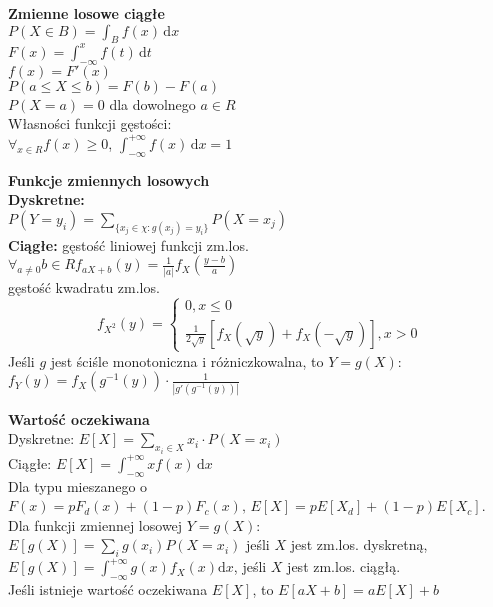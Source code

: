 \documentclass[10pt,landscape,a4paper,notitlepage]{article}
\begin{document}
\begin{multicols*}{4}
        \noindent \textbf{\large Zmienne losowe ciągłe}\\
        $P(X\in B)=\int_{B} f(x)\,\mathrm{d}x$\\
        $F(x)=\int_{-\infty}^xf(t)\,\mathrm{d}t$\\
        $f(x)=F'(x)$\\
        $P(a\leq X\leq b)=F(b)-F(a)$\\
        $P(X = a)=0$ dla dowolnego $a\in R$\\
        Własności funkcji gęstości:\\
        $\forall_{x\in R}f(x)\geq 0$, $\int_{-\infty}^{+\infty}f(x)\,\mathrm{d}x=1$
        

        \noindent\textbf{\large Funkcje zmiennych losowych}\\
        \textbf{Dyskretne:}\\ $P(Y=y_i)=\sum_{\{x_j\in\chi:g(x_j)=y_i\}}P(X=x_j)$\\
        \textbf{Ciągłe:} gęstość liniowej funkcji zm.los.\\ $\forall_{a\neq 0}b\in R f_{aX+b}(y)=\frac{1}{|a|}f_X\left(\frac{y-b}{a}\right)$\\
        gęstość kwadratu zm.los.\\
        \[
            f_{X^2}(y)=
            \begin{cases}
                0, x\leq 0\\
                \frac{1}{2\sqrt{y}}\left[f_X(\sqrt{y})+f_X(-\sqrt{y})\right], x>0
            \end{cases}
        \]
        Jeśli $g$ jest ściśle monotoniczna i różniczkowalna, to $Y=g(X)$: $f_Y(y)=f_X(g^{-1}(y))\cdot\frac{1}{|g'(g^{-1}(y))|}$

        \noindent\textbf{\large Wartość oczekiwana}\\
        Dyskretne: $E[X]=\sum_{x_i\in X}x_i\cdot P(X=x_i)$\\
        Ciągłe: $E[X]=\int_{-\infty}^{+\infty}xf(x)\,\mathrm{d}x$\\
        Dla typu mieszanego o $F(x)=pF_d(x)+(1-p)F_c(x),\,E[X]=pE[X_d]+(1-p)E[X_c]$.\\
        Dla funkcji zmiennej losowej $Y=g(X)$:\\
        $E[g(X)]=\sum_ig(x_i)P(X=x_i)$ jeśli $X$ jest zm.los. dyskretną, $E[g(X)]=\int_{-\infty}^{+\infty}g(x)f_X(x)\mathrm{d}x$, jeśli $X$ jest zm.los. ciągłą.\\
        Jeśli istnieje wartość oczekiwana $E[X]$, to $E[aX+b]=aE[X]+b$


\end{multicols*}
\end{document}

